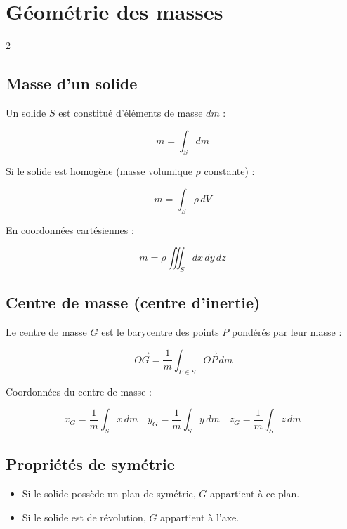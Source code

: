 \documentclass[10pt,a4paper]{article}
\renewcommand{\vec}{\overrightarrow}
\begin{document}
    \section{Géométrie des masses}
        \begin{multicols}{2}
            
        \subsection{Masse d'un solide}

            Un solide $S$ est constitué d'éléments de masse $dm$ :

            \[
            m = \int_S dm
            \]

            Si le solide est homogène (masse volumique $\rho$ constante) :

            \[
            m = \int_S \rho \, dV
            \]

            En coordonnées cartésiennes :

            \[
            m = \rho \iiint_S dx\,dy\,dz
            \]


        \subsection{Centre de masse (centre d'inertie)}

            Le centre de masse $G$ est le barycentre des points $P$ pondérés par
            leur masse :

            \[
            \, \vec{OG} = \frac{1}{m} \int_{P\in S} \vec{OP} \, dm
            \]

            Coordonnées du centre de masse :

            \[
            x_G = \frac{1}{m} \int_S x\,dm
            \quad
            y_G = \frac{1}{m} \int_S y\,dm
            \quad
            z_G = \frac{1}{m} \int_S z\,dm
            \]



        \subsection{Propriétés de symétrie}

            \begin{itemize}
                \item Si le solide possède un plan de symétrie, $G$ appartient à ce plan.
                \item Si le solide est de révolution, $G$ appartient à l'axe.
            \end{itemize}



\end{multicols}
\end{document}
